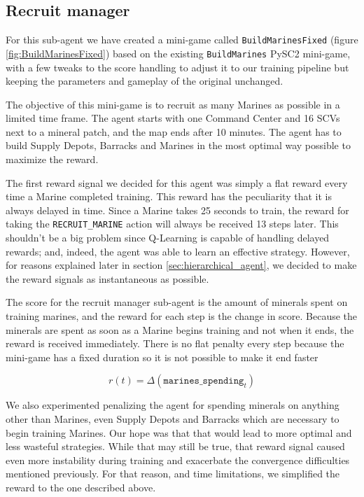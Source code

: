 \subsection{Recruit manager}

For this sub-agent we have created a mini-game called \texttt{BuildMarinesFixed} (figure \ref{fig:BuildMarinesFixed}) based on the existing \texttt{BuildMarines} PySC2 mini-game, with a few tweaks to the score handling to adjust it to our training pipeline but keeping the parameters and gameplay of the original unchanged.

The objective of this mini-game is to recruit as many Marines as possible in a limited time frame. The agent starts with one Command Center and 16 SCVs next to a mineral patch, and the map ends after 10 minutes. The agent has to build Supply Depots, Barracks and Marines in the most optimal way possible to maximize the reward.

The first reward signal we decided for this agent was simply a flat reward every time a Marine completed training. This reward has the peculiarity that it is always delayed in time. Since a Marine takes 25 seconds to train, the reward for taking the \texttt{RECRUIT\_MARINE} action will always be received 13 steps later. This shouldn't be a big problem since Q-Learning is capable of handling delayed rewards; and, indeed, the agent was able to learn an effective strategy. However, for reasons explained later in section \ref{sec:hierarchical_agent}, we decided to make the reward signals as instantaneous as possible.

The score for the recruit manager sub-agent is the amount of minerals spent on training marines, and the reward for each step is the change in score. Because the minerals are spent as soon as a Marine begins training and not when it ends, the reward is received immediately. There is no flat penalty every step because the mini-game has a fixed duration so it is not possible to make it end faster

$$
r(t) = \Delta(\texttt{marines\_spending}_{t})
$$

We also experimented penalizing the agent for spending minerals on anything other than Marines, even Supply Depots and Barracks which are necessary to begin training Marines. Our hope was that that would lead to more optimal and less wasteful strategies. While that may still be true, that reward signal caused even more instability during training and exacerbate the convergence difficulties mentioned previously. For that reason, and time limitations, we simplified the reward to the one described above.

